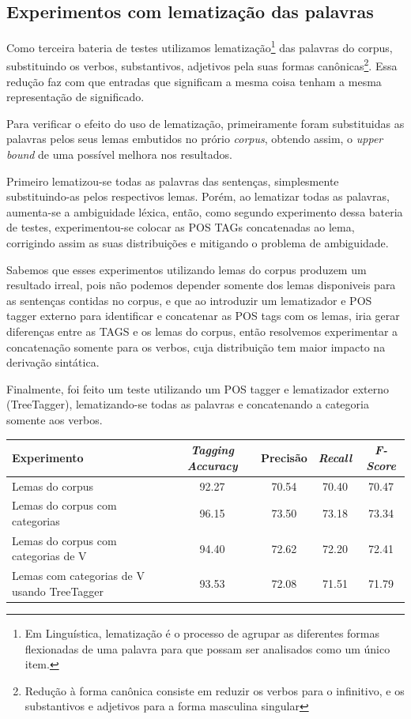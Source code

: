 \subsection{Experimentos com lematização das palavras}
\label{sec:lematizacao}

Como terceira bateria de testes utilizamos lematização\footnote{Em Linguística, lematização é o processo de agrupar as diferentes formas flexionadas de uma palavra para que possam ser analisados como um único item.} das palavras do corpus, substituindo os verbos,
substantivos, adjetivos pela suas formas canônicas\footnote{Redução à forma canônica consiste em reduzir os verbos para o infinitivo, e os substantivos e adjetivos para a forma masculina singular}. Essa redução faz com que entradas que significam a mesma coisa tenham a mesma representação de significado.

Para verificar o efeito do uso de lematização, primeiramente foram substituidas as palavras pelos seus lemas embutidos no prório \emph{corpus}, obtendo assim, o \emph{upper bound} de uma possível melhora nos resultados.

Primeiro lematizou-se todas as palavras das sentenças, simplesmente substituindo-as pelos respectivos lemas. Porém, ao lematizar todas as palavras, aumenta-se a ambiguidade léxica, então, como segundo experimento dessa bateria de testes, experimentou-se colocar as POS TAGs concatenadas ao lema, corrigindo assim as suas distribuições e mitigando o problema de ambiguidade. 

Sabemos que esses experimentos utilizando lemas do corpus produzem um resultado irreal, pois não podemos depender somente dos lemas disponiveis para as sentenças contidas no corpus, e que ao introduzir um lematizador e POS tagger externo para identificar e concatenar as POS tags com os lemas, iria gerar diferenças entre as TAGS e os lemas do corpus, então resolvemos experimentar a concatenação somente para os verbos, cuja distribuição tem maior impacto na derivação sintática.

Finalmente, foi feito um teste utilizando um POS tagger e lematizador externo (TreeTagger), lematizando-se todas as palavras e concatenando a categoria somente aos verbos.


\begin{center}
   \footnotesize
	\begin{tabular}{|l|c|c|c|c|}
		\hline
		\textbf{Experimento} &  \textbf{\emph{Tagging Accuracy}} & \textbf{Precisão} & \textbf{\emph{Recall}} & \textbf{\emph{F-Score}} \\
		\hline
		Lemas do corpus & 92.27 & 70.54 & 70.40 & 70.47\\
		\hline		
		Lemas do corpus com categorias & 96.15 & 73.50 & 73.18 & 73.34\\
		\hline		
		Lemas do corpus com categorias de V & 94.40 & 72.62 & 72.20 & 72.41\\
		\hline		
		Lemas com categorias de V usando TreeTagger & 93.53 & 72.08 & 71.51 & 71.79\\
		\hline
	\end{tabular}
	\label{tab:terceiro_experimento}
\end{center}


